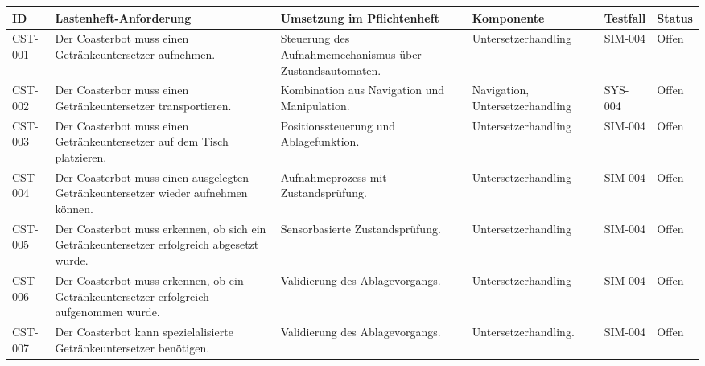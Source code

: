 \documentclass[
]{article}
\begin{document}
\begin{longtable}[]{@{}
  >{\raggedright\arraybackslash}p{}
  >{\raggedright\arraybackslash}p{}
  >{\raggedright\arraybackslash}p{}
  >{\raggedright\arraybackslash}p{}
  >{\raggedright\arraybackslash}p{}
  >{\raggedright\arraybackslash}p{}@{}}
\toprule\noalign{}
\begin{minipage}[b]{\linewidth}\raggedright
ID
\end{minipage} & \begin{minipage}[b]{\linewidth}\raggedright
Lastenheft-Anforderung
\end{minipage} & \begin{minipage}[b]{\linewidth}\raggedright
Umsetzung im Pflichtenheft
\end{minipage} & \begin{minipage}[b]{\linewidth}\raggedright
Komponente
\end{minipage} & \begin{minipage}[b]{\linewidth}\raggedright
Testfall
\end{minipage} & \begin{minipage}[b]{\linewidth}\raggedright
Status
\end{minipage} \\
\midrule\noalign{}
\endhead
\bottomrule\noalign{}
\endlastfoot
CST-001 & Der Coasterbot muss einen Getränkeuntersetzer aufnehmen. &
Steuerung des Aufnahmemechanismus über Zustandsautomaten. &
Untersetzerhandling & SIM-004 & Offen \\
CST-002 & Der Coasterbor muss einen Getränkeuntersetzer transportieren.
& Kombination aus Navigation und Manipulation. & Navigation,
Untersetzerhandling & SYS-004 & Offen \\
CST-003 & Der Coasterbot muss einen Getränkeuntersetzer auf dem Tisch
platzieren. & Positionssteuerung und Ablagefunktion. &
Untersetzerhandling & SIM-004 & Offen \\
CST-004 & Der Coasterbot muss einen ausgelegten Getränkeuntersetzer
wieder aufnehmen können. & Aufnahmeprozess mit Zustandsprüfung. &
Untersetzerhandling & SIM-004 & Offen \\
CST-005 & Der Coasterbot muss erkennen, ob sich ein Getränkeuntersetzer
erfolgreich abgesetzt wurde. & Sensorbasierte Zustandsprüfung. &
Untersetzerhandling & SIM-004 & Offen \\
CST-006 & Der Coasterbot muss erkennen, ob ein Getränkeuntersetzer
erfolgreich aufgenommen wurde. & Validierung des Ablagevorgangs. &
Untersetzerhandling & SIM-004 & Offen \\
CST-007 & Der Coasterbot kann spezielalisierte Getränkeuntersetzer
benötigen. & Validierung des Ablagevorgangs. & Untersetzerhandling. &
SIM-004 & Offen \\
\end{longtable}
\end{document}
